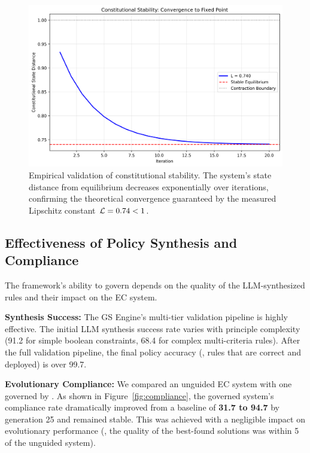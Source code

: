 \begin{figure}[H]
    \centering
    \includegraphics[width=\linewidth]{stability_analysis.png}
    \caption{Empirical validation of constitutional stability. The system's state distance from equilibrium decreases exponentially over iterations, confirming the theoretical convergence guaranteed by the measured Lipschitz constant $\lipschitz = 0.74 < 1$.}
    \label{fig:stability_analysis}
\end{figure}

\subsection{Effectiveness of Policy Synthesis and Compliance}
The framework's ability to govern depends on the quality of the LLM-synthesized rules and their impact on the EC system.

\textbf{Synthesis Success:} The GS Engine's multi-tier validation pipeline is highly effective. The initial LLM synthesis success rate varies with principle complexity (91.2\percent{} for simple boolean constraints, 68.4\percent{} for complex multi-criteria rules). After the full validation pipeline, the final policy accuracy (\ie{}, rules that are correct and deployed) is over 99.7\percent{}.

\textbf{Evolutionary Compliance:} We compared an unguided EC system with one governed by \acgs{}. As shown in Figure~\ref{fig:compliance}, the governed system's compliance rate dramatically improved from a baseline of \textbf{31.7\percent{} to 94.7\percent{}} by generation 25 and remained stable. This was achieved with a negligible impact on evolutionary performance (\ie{}, the quality of the best-found solutions was within 5\percent{} of the unguided system).

